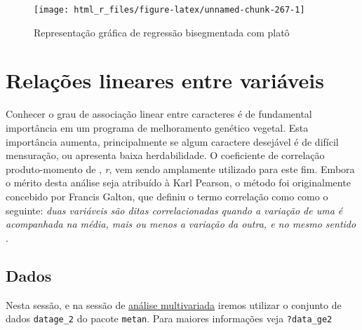 \documentclass[
]{book}
\newenvironment{Shaded}{\begin{snugshade}}{\end{snugshade}}
\newcommand{\KeywordTok}[1]{\textcolor[rgb]{0.13,0.29,0.53}{\textbf{#1}}}
\newcommand{\NormalTok}[1]{#1}
\newcommand{\OperatorTok}[1]{\textcolor[rgb]{0.81,0.36,0.00}{\textbf{#1}}}
\newcommand{\StringTok}[1]{\textcolor[rgb]{0.31,0.60,0.02}{#1}}
\begin{document}
\begin{figure}

{\centering \texttt{[image: html\_r\_files/figure-latex/unnamed-chunk-267-1]} 

}

\caption{Representação gráfica de regressão bisegmentada com platô}\label{fig:unnamed-chunk-267}
\end{figure}

\hypertarget{relations}{%
\chapter{Relações lineares entre variáveis}\label{relations}}

Conhecer o grau de associação linear entre caracteres é de fundamental importância em um programa de melhoramento genético vegetal. Esta importância aumenta, principalmente se algum caractere desejável é de difícil mensuração, ou apresenta baixa herdabilidade. O coeficiente de correlação  produto-momento de \citet{Pearson1920}, \emph{r}, vem sendo amplamente utilizado para este fim. Embora o mérito desta análise seja atribuído à Karl Pearson, o método foi originalmente concebido por Francis Galton, que definiu o termo correlação como como o seguinte: \emph{duas variáveis são ditas correlacionadas quando a variação de uma é acompanhada na média, mais ou menos a variação da outra, e no mesmo sentido} \citep{Galton1888}.

\hypertarget{dados}{%
\section{Dados}\label{dados}}

Nesta sessão, e na sessão de \protect\hyperlink{multivariate}{análise multivariada} iremos utilizar o conjunto de dados \texttt{datage\_2} do pacote \texttt{metan}. Para maiores informações veja \texttt{?data\_ge2}

\begin{Shaded}
\end{Shaded}
\end{document}
